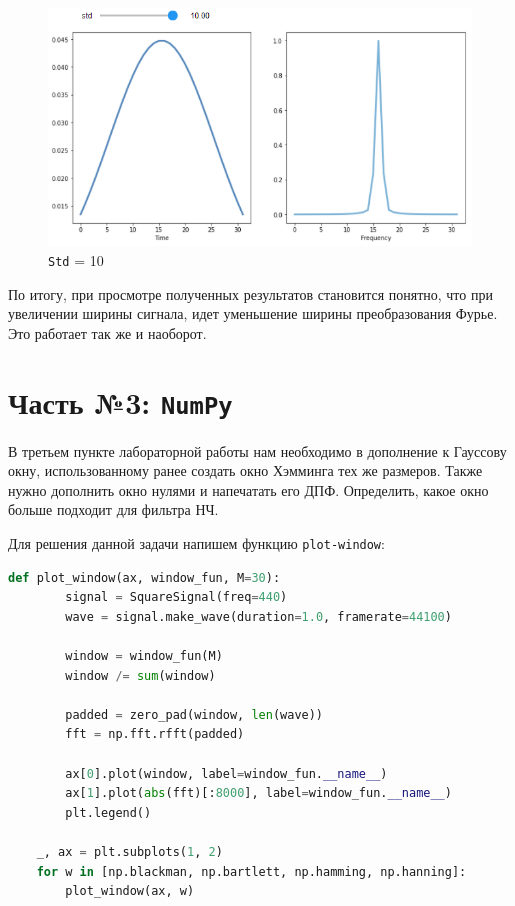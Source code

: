 \documentclass[a4paper]{article}
\begin{document}
            \begin{figure}[H]
                \centering
                \includegraphics[width=\textwidth]{ex_2_std_10.png}
                \caption{\texttt{Std} = 10}
                \label{fig:ex_2_std_10}
            \end{figure}
            
            По итогу, при просмотре полученных результатов становится понятно, что при увеличении ширины сигнала, идет уменьшение ширины преобразования Фурье. Это работает так же и наоборот.
            
    \newpage
        \section{Часть №3: \texttt{NumPy}}
            В третьем пункте лабораторной работы нам необходимо в дополнение к Гауссову окну, использованному ранее создать окно Хэмминга тех же размеров. Также нужно дополнить окно нулями и напечатать его ДПФ. Определить, какое окно больше подходит для фильтра НЧ.
            
            Для решения данной задачи напишем функцию \texttt{plot-window}:
            
\begin{lstlisting}[language=Python, caption= Функция \texttt{plot-window}]
    def plot_window(ax, window_fun, M=30):
        signal = SquareSignal(freq=440)
        wave = signal.make_wave(duration=1.0, framerate=44100)
        
        window = window_fun(M)
        window /= sum(window)
        
        padded = zero_pad(window, len(wave))
        fft = np.fft.rfft(padded)
        
        ax[0].plot(window, label=window_fun.__name__)
        ax[1].plot(abs(fft)[:8000], label=window_fun.__name__)
        plt.legend()
        
    _, ax = plt.subplots(1, 2)
    for w in [np.blackman, np.bartlett, np.hamming, np.hanning]:
        plot_window(ax, w)
\end{lstlisting}
            
\end{document}
